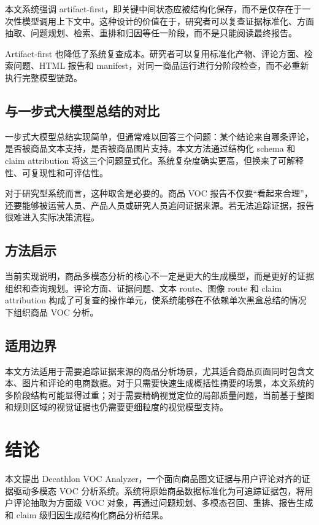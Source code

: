 \documentclass[11pt]{article}
\begin{document}
本文系统强调 artifact-first，即关键中间状态应被结构化保存，而不是仅存在于一次性模型调用上下文中。这种设计的价值在于，研究者可以复查证据标准化、方面抽取、问题规划、检索、重排和归因等任一阶段，而不是只能阅读最终报告。

Artifact-first 也降低了系统复查成本。研究者可以复用标准化产物、评论方面、检索问题、HTML 报告和 manifest，对同一商品运行进行分阶段检查，而不必重新执行完整模型链路。

\subsection{与一步式大模型总结的对比}

一步式大模型总结实现简单，但通常难以回答三个问题：某个结论来自哪条评论，是否被商品文本支持，是否被商品图片支持。本文方法通过结构化 schema 和 claim attribution 将这三个问题显式化。系统复杂度确实更高，但换来了可解释性、可复现性和可评估性。

对于研究型系统而言，这种取舍是必要的。商品 VOC 报告不仅要``看起来合理''，还要能够被运营人员、产品人员或研究人员追问证据来源。若无法追踪证据，报告很难进入实际决策流程。

\subsection{方法启示}

当前实现说明，商品多模态分析的核心不一定是更大的生成模型，而是更好的证据组织和查询规划。评论方面、证据问题、文本 route、图像 route 和 claim attribution 构成了可复查的操作单元，使系统能够在不依赖单次黑盒总结的情况下组织商品 VOC 分析。

\subsection{适用边界}

本文方法适用于需要追踪证据来源的商品分析场景，尤其适合商品页面同时包含文本、图片和评论的电商数据。对于只需要快速生成概括性摘要的场景，本文系统的多阶段结构可能显得过重；对于需要精确视觉定位的局部质量问题，当前基于整图和规则区域的视觉证据也仍需要更细粒度的视觉模型支持。

\section{结论}
本文提出 Decathlon VOC Analyzer，一个面向商品图文证据与用户评论对齐的证据驱动多模态 VOC 分析系统。系统将原始商品数据标准化为可追踪证据包，将用户评论抽取为方面级 VOC 对象，再通过问题规划、多模态召回、重排、报告生成和 claim 级归因生成结构化商品分析结果。
\end{document}
